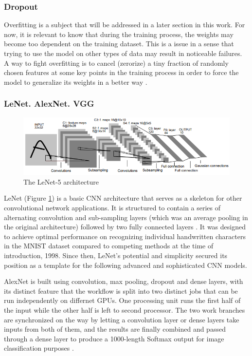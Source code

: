 \subsubsection{Dropout}
\label{subsubsec:ch3sec3subsec3subsubsec3}

Overfitting is a subject that will be addressed in a later section in this work. For now, it is relevant to know that during the training process, the weights may become too dependent on the training dataset. This is a issue in a sense that trying to use the model on other types of data may result in noticeable failures. A way to fight overfitting is to cancel (zerorize) a tiny fraction of randomly chosen features at some key points in the training process in order to force the model to generalize its weights in a better way \cite{dropout}.

\subsubsection{LeNet. AlexNet. VGG}
\label{subsubsec:ch3sec3subsec3subsubsec4}

\begin{figure}[htbp]
    \centering
        \includegraphics[width=\textwidth]{figures/lenet.PNG}
    \caption{The LeNet-5 architecture \cite{lenet}}
    \label{FigLeNet}
\end{figure}

LeNet (Figure \ref{FigLeNet}) is a basic CNN architecture that serves as a skeleton for other convolutional network applications. It is structured to contain a series of alternating convolution and sub-sampling layers (which was an average pooling in the original architecture) followed by two fully connected layers \cite{lenet}. It was designed to achieve optimal performance on recognizing individual handwritten characters in the MNIST dataset compared to competing methods at the time of introduction, 1998. Since then, LeNet's potential and simplicity secured its position as a template for the following advanced and sophisticated CNN models.

AlexNet is built using convolution, max pooling, dropout and dense layers, with its distinct feature that the workflow is split into two distinct jobs that can be run independently on differnet GPUs. One processing unit runs the first half of the input while the other half is left to second processor. The two work branches are synchronized on the way by letting a convolution layer or dense layers take inputs from both of them, and the results are finally combined and passed through a dense layer to produce a 1000-length Softmax output for image classification purposes \cite{alexnet}.


